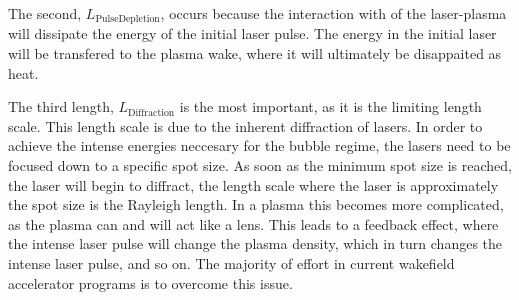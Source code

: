 \documentclass[12pt, titlepage]{article}
\begin{document}
    The second, $L_\mathrm{Pulse Depletion}$, occurs because the interaction
    with of the laser-plasma will dissipate the energy of the initial laser
    pulse. The energy in the initial laser will be transfered to the plasma
    wake, where it will ultimately be disappaited as heat. 

    The third length, $L_\mathrm{Diffraction}$ is the most important, as it is
    the limiting length scale. This length scale is due to the inherent
    diffraction of lasers. In order to achieve the intense energies neccesary
    for the bubble regime, the lasers need to be focused down to a specific spot
    size. As soon as the minimum spot size is reached, the laser will begin to
    diffract, the length scale where the laser is approximately the spot size is
    the Rayleigh length. In a plasma this becomes more complicated, as the
    plasma can and will act like a lens. This leads to a feedback effect, where
    the intense laser pulse will change the plasma density, which in turn
    changes the intense laser pulse, and so on. The majority of effort in current wakefield accelerator  programs is to overcome this issue.
\end{document}
